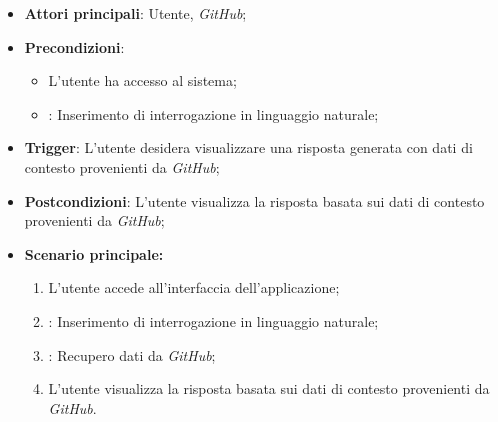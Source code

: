 \hypertarget{UC8.1}{}
\begin{itemize}
    \item \textbf{Attori principali}: Utente, \emph{GitHub};
    \item \textbf{Precondizioni}: 
    \begin{itemize}
        \item L'utente ha accesso al sistema;
        \item {}: Inserimento di interrogazione in linguaggio naturale;
    \end{itemize}
    \item \textbf{Trigger}: L'utente desidera visualizzare una risposta generata con dati di contesto provenienti da \emph{GitHub};
    \item \textbf{Postcondizioni}: L'utente visualizza la risposta basata sui dati di contesto provenienti da \emph{GitHub};
    \item \textbf{Scenario principale:}
    \begin{enumerate}
        \item L'utente accede all'interfaccia dell'applicazione;
        \item {}: Inserimento di interrogazione in linguaggio naturale;
        \item {}: Recupero dati da \emph{GitHub};
        \item L'utente visualizza la risposta basata sui dati di contesto provenienti da \emph{GitHub}.
    \end{enumerate}
\end{itemize}

